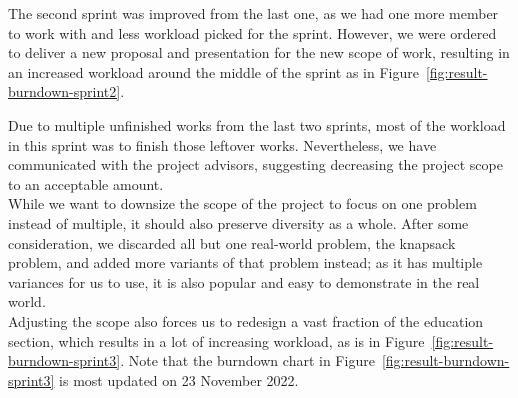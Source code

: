 \documentclass[12pt,oneside,openright,a4paper]{cpe-english-project}
\begin{document}
\begin{enumerate}
\begin{minipage}[c]{\textwidth}
	\label{fig:result-burndown-sprint2}
	\end{minipage}
	The second sprint was improved from the last one, as we had one more member to work with and less workload picked for the sprint. However, we were ordered to deliver a new proposal and presentation for the new scope of work, resulting in an increased workload around the middle of the sprint as in Figure~\ref{fig:result-burndown-sprint2}. \\
	\begin{minipage}[c]{\textwidth}\centering
	\label{fig:result-burndown-sprint3}
	\end{minipage}
	Due to multiple unfinished works from the last two sprints, most of the workload in this sprint was to finish those leftover works. Nevertheless, we have communicated with the project advisors, suggesting decreasing the project scope to an acceptable amount. \\
	While we want to downsize the scope of the project to focus on one problem instead of multiple, it should also preserve diversity as a whole. After some consideration, we discarded all but one real-world problem, the knapsack problem, and added more variants of that problem instead; as it has multiple variances for us to use, it is also popular and easy to demonstrate in the real world. \\
	Adjusting the scope also forces us to redesign a vast fraction of the education section, which results in a lot of increasing workload, as is in Figure~\ref{fig:result-burndown-sprint3}. Note that the burndown chart in Figure~\ref{fig:result-burndown-sprint3} is most updated on 23 November 2022.


\end{enumerate}
\end{document}
